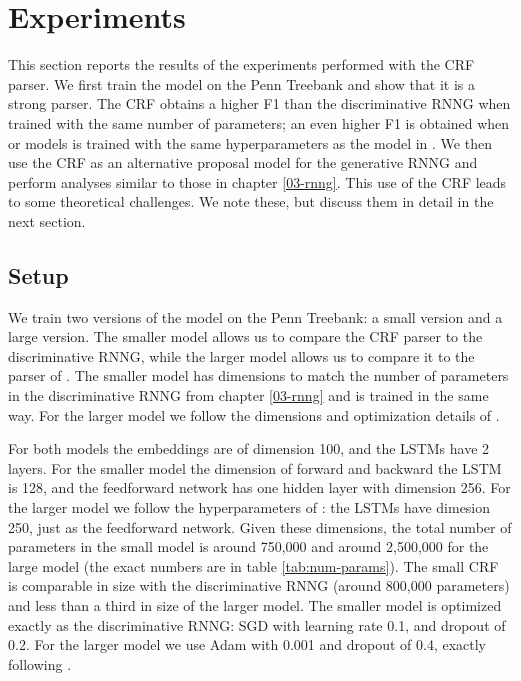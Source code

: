 \section{Experiments}
  This section reports the results of the experiments performed with the CRF parser. We first train the model on the Penn Treebank and show that it is a strong parser. The CRF obtains a higher F1 than the discriminative RNNG when trained with the same number of parameters; an even higher F1 is obtained when or models is trained with the same hyperparameters as the model in \citet{stern2017minimal}. We then use the CRF as an alternative proposal model for the generative RNNG and perform analyses similar to those in chapter \ref{03-rnng}. This use of the CRF leads to some theoretical challenges. We note these, but discuss them in detail in the next section.

  \subsection{Setup}
    We train two versions of the model on the Penn Treebank: a small version and a large version. The smaller model allows us to compare the CRF parser to the discriminative RNNG, while the larger model allows us to compare it to the parser of \citet{stern2017minimal}. The smaller model has dimensions to match the number of parameters in the discriminative RNNG from chapter \ref{03-rnng} and is trained in the same way. For the larger model we follow the dimensions and optimization details of \citet{stern2017minimal}.

    For both models the embeddings are of dimension 100, and the LSTMs have 2 layers. For the smaller model the dimension of forward and backward the LSTM is 128, and the feedforward network has one hidden layer with dimension 256. For the larger model we follow the hyperparameters of \citet{stern2017minimal}: the LSTMs have dimesion 250, just as the feedforward network. Given these dimensions, the total number of parameters in the small model is around 750,000 and around 2,500,000 for the large model (the exact numbers are in table \ref{tab:num-params}). The small CRF is comparable in size with the discriminative RNNG (around 800,000 parameters) and less than a third in size of the larger model. The smaller model is optimized exactly as the discriminative RNNG: SGD with learning rate 0.1, and dropout of 0.2. For the larger model we use Adam \citep{kingma2014adam} with 0.001 and dropout of 0.4, exactly following \citet{stern2017minimal}.


